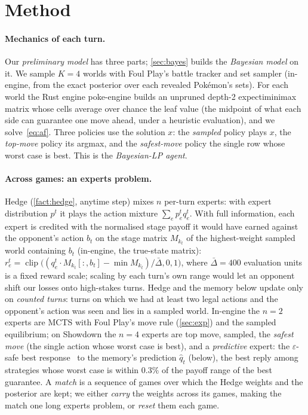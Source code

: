 \documentclass[10pt]{article}
\theoremstyle{tplain}
\theoremstyle{tdef}
\theoremstyle{trem}
\newcommand{\qhat}{\hat q}
\DeclareMathOperator{\clip}{clip}
\begin{document}
\section{Method}
\label{sec:method}
\paragraph{Mechanics of each turn.} Our \emph{preliminary model} has three parts; \cref{sec:bayes} builds the \emph{Bayesian model} on it. We sample $K=4$ worlds with Foul Play's battle tracker and set sampler (in-engine, from the exact posterior over each revealed Pok\'emon's sets). For each world the Rust engine poke-engine builds an unpruned depth-2 expectiminimax matrix whose cells average over chance the leaf value (the midpoint of what each side can guarantee one move ahead, under a heuristic evaluation), and we solve~\eqref{eq:af}. Three policies use the solution $x$: the \emph{sampled} policy plays $x$, the \emph{top-move} policy its argmax, and the \emph{safest-move} policy the single row whose worst case is best. This is the \emph{Bayesian-LP agent}.

\paragraph{Across games: an experts problem.} Hedge (\cref{fact:hedge}, anytime step) mixes $n$ per-turn experts: with expert distribution $p^t$ it plays the action mixture $\sum_ep^t_eq^t_e$. With full information, each expert is credited with the normalised stage payoff it would have earned against the opponent's action $b_t$ on the stage matrix $M_{k_t}$ of the highest-weight sampled world containing $b_t$ (in-engine, the true-state matrix): $r^t_e=\clip\big((q^t_e\cdot M_{k_t}[:,b_t]-\min M_{k_t})/\bar\Delta,0,1\big)$, where $\bar\Delta=400$ evaluation units is a fixed reward scale; scaling by each turn's own range would let an opponent shift our losses onto high-stakes turns. Hedge and the memory below update only on \emph{counted turns}: turns on which we had at least two legal actions and the opponent's action was seen and lies in a sampled world. In-engine the $n=2$ experts are MCTS with Foul Play's move rule (\cref{sec:exp}) and the sampled equilibrium; on Showdown the $n=4$ experts are top move, sampled, the \emph{safest move} (the single action whose worst case is best), and a \emph{predictive} expert: the $\varepsilon$-safe best response~\cite{GS15} to the memory's prediction $\qhat_t$ (below), the best reply among strategies whose worst case is within $0.3\%$ of the payoff range of the best guarantee. A \emph{match} is a sequence of games over which the Hedge weights and the posterior are kept; we either \emph{carry} the weights across its games, making the match one long experts problem, or \emph{reset} them each game.
\end{document}
